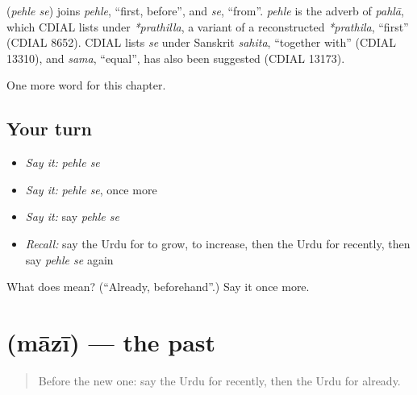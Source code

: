 \begin{cousinweb}
\textbf{ } (\emph{pehle se}) joins \emph{pehle}, \textquotedblleft{}first, before\textquotedblright{}, and \emph{se}, \textquotedblleft{}from\textquotedblright{}. \emph{pehle} is the adverb of \emph{pahlā}, which CDIAL lists under \emph{*prathilla}, a variant of a reconstructed \emph{*prathila}, \textquotedblleft{}first\textquotedblright{} (CDIAL 8652). CDIAL lists \emph{se} under Sanskrit \emph{sahita}, \textquotedblleft{}together with\textquotedblright{} (CDIAL 13310), and \emph{sama}, \textquotedblleft{}equal\textquotedblright{}, has also been suggested (CDIAL 13173).
\end{cousinweb}

\begin{grammarlens}[title={What you've built}]
One more word for this chapter.
\end{grammarlens}

\subsection*{Your turn}
\begin{itemize}
\raggedright
  \item \emph{Say it:} \emph{pehle se}
  \item \emph{Say it:} \emph{pehle se}, once more
  \item \emph{Say it:} say \emph{pehle se}
  \item \emph{Recall:} say the Urdu for to grow, to increase, then the Urdu for recently, then say \emph{pehle se} again
\end{itemize}

\begin{tcolorbox}[breakable,colback=teal!4,colframe=teal!35!black,title={Before you move on}]
What does   mean? (\textquotedblleft{}Already, beforehand\textquotedblright{}.) Say it once more.
\end{tcolorbox}
\section[\texorpdfstring{\ur{ماضی} (māzī)}{ماضی (māzī)}]{ (māzī) — the past}

\label{lesson:UR-C144-mazi}



\begin{quote}
Before the new one: say the Urdu for recently, then the Urdu for already.
\end{quote}

